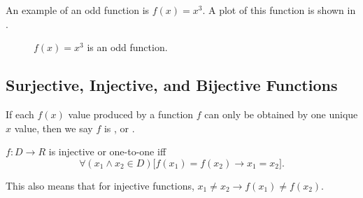 \begin{ex}
  An example of an odd function is $f(x)=x^3$.
  A plot of this function is shown in .
  \begin{figure}
    \begin{center}
    \end{center}
    \caption{$f(x)=x^3$ is an odd function.}
    \label{fig:functions:odd}
  \end{figure}
\end{ex}

\subsection{Surjective, Injective, and Bijective Functions}

\begin{defn}[injective]
  If each $f(x)$ value produced by a function $f$ can only be obtained by one 
  unique $x$ value, then we say $f$ is , or 
  .

  $ f: D \to R $ is injective or one-to-one iff
  \[
    \forall{(x_1 \wedge x_2 \in D)}
    \big[f(x_1)=f(x_2)
    \to x_1=x_2\big].
  \]
  \begin{remark}
    This also means that for injective functions,
    $ x_1 \neq x_2 \to f(x_1) \neq f(x_2)$.
  \end{remark}
\end{defn}

